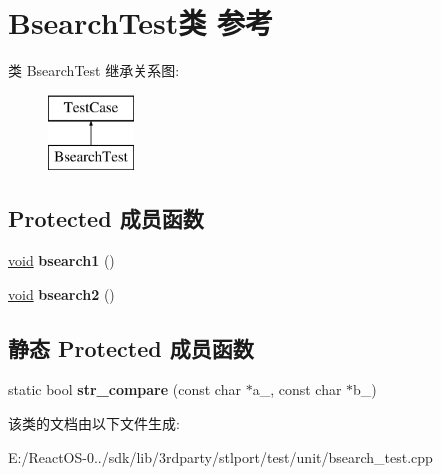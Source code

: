 \hypertarget{class_bsearch_test}{}\section{Bsearch\+Test类 参考}
\label{class_bsearch_test}
类 Bsearch\+Test 继承关系图\+:\begin{figure}[H]
\begin{center}
\leavevmode
\includegraphics[height=2.000000cm]{class_bsearch_test}
\end{center}
\end{figure}
\subsection*{Protected 成员函数}
\begin{DoxyCompactItemize}
\item 
\mbox{\label{class_bsearch_test_ac6a2261774dd0a346df56e5d69a962aa}} 
\hyperlink{interfacevoid}{void} {\bfseries bsearch1} ()
\item 
\mbox{\label{class_bsearch_test_abe2947821068f11feac938315c86e5b2}} 
\hyperlink{interfacevoid}{void} {\bfseries bsearch2} ()
\end{DoxyCompactItemize}
\subsection*{静态 Protected 成员函数}
\begin{DoxyCompactItemize}
\item 
\mbox{\label{class_bsearch_test_a23aa5838cba9751bb1d529a3391bfa72}} 
static bool {\bfseries str\+\_\+compare} (const char $\ast$a\+\_\+, const char $\ast$b\+\_\+)
\end{DoxyCompactItemize}


该类的文档由以下文件生成\+:\begin{DoxyCompactItemize}
\item 
E\+:/\+React\+O\+S-\/0../sdk/lib/3rdparty/stlport/test/unit/bsearch\+\_\+test.\+cpp\end{DoxyCompactItemize}
